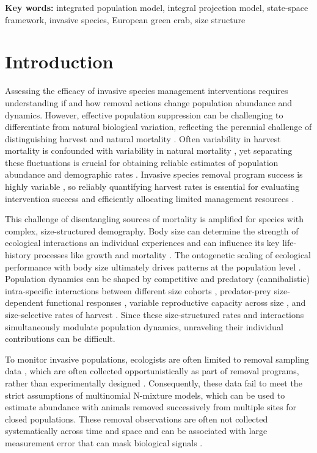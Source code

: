 \documentclass{article}
\begin{document}
\textbf{Key words:} integrated population model, integral projection model, state-space framework, invasive species, European green crab, size structure

\newpage

\section{Introduction}

Assessing the efficacy of invasive species management interventions requires understanding if and how removal actions change population abundance and dynamics. However, effective population suppression can be challenging to differentiate from natural biological variation, reflecting the perennial challenge of distinguishing harvest and natural mortality \parencite{aanes2007estimation}. Often variability in harvest mortality is confounded with variability in natural mortality \parencite{lewy2003modelling}, yet separating these fluctuations is crucial for obtaining reliable estimates of population abundance and demographic rates \parencite{walters2004fisheries}. Invasive species removal program success is highly variable \parencite{prior2018does}, so reliably quantifying harvest rates is essential for evaluating intervention success and efficiently allocating limited management resources \parencite{green2021functional}.

This challenge of disentangling sources of mortality is amplified for species with complex, size-structured demography. Body size can determine the strength of ecological interactions an individual experiences and can influence its key life-history processes like growth and mortality \parencite{de2003influence}. The ontogenetic scaling of ecological performance with body size ultimately drives patterns at the population level \parencite{werner1994ontogenetic}. Population dynamics can be shaped by competitive and predatory (cannibalistic) intra-specific interactions between different size cohorts \parencite{claessen2004population}, predator-prey size-dependent functional responses \parencite{aljetlawi2004prey}, variable reproductive capacity across size \parencite{hixon2014boffffs}, and size-selective rates of harvest \parencite{tu2018fishing}. Since these size-structured rates and interactions simultaneously modulate population dynamics, unraveling their individual contributions can be difficult. 

To monitor invasive populations, ecologists are often limited to removal sampling data \parencite{udell2022open}, which are often collected opportunistically as part of removal programs, rather than experimentally designed \parencite{tiberti2021alien, crall2010improving, rogosch2021comparing}. Consequently, these data fail to meet the strict assumptions of multinomial N-mixture models, which can be used to estimate abundance with animals removed successively from multiple sites \parencite{dorazio2005improving} for closed populations. These removal observations are often not collected systematically across time and space and can be associated with large measurement error that can mask biological signals \parencite{auger2016state, sibert2003horizontal, katsanevakis2012monitoring}.
\end{document}
